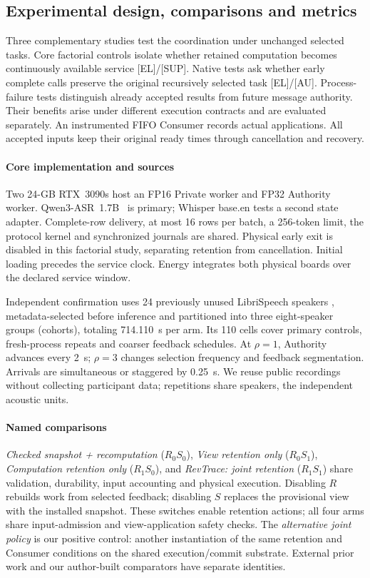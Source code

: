 \subsection{Experimental design, comparisons and metrics}
Three complementary studies test the coordination under unchanged
selected tasks. Core factorial controls isolate whether retained
computation becomes continuously available service [EL]/[SUP]. Native
tests ask whether early complete calls preserve the original recursively
selected task [EL]/[AU]. Process-failure tests distinguish already
accepted results from future message authority. Their benefits arise
under different execution contracts and are evaluated separately.
An instrumented FIFO Consumer records actual applications. All accepted
inputs keep their original ready times through cancellation and recovery.

\paragraph{Core implementation and sources}
Two 24-GB RTX~3090s host an FP16 Private worker and FP32 Authority worker.
Qwen3-ASR~1.7B~\cite{shi2026qwen3asr} is primary; Whisper base.en
\cite{radford2023whisper} tests a second state adapter. Complete-row
delivery, at most 16 rows per batch, a 256-token limit, the protocol kernel
and synchronized journals are shared. Physical early exit is disabled
in this factorial study, separating retention from cancellation.
Initial loading precedes the service clock. Energy integrates both
physical boards over the declared service window.

Independent confirmation uses 24 previously unused LibriSpeech speakers
\cite{panayotov2015librispeech}, metadata-selected before inference and
partitioned into three eight-speaker groups (cohorts), totaling 714.110~s per arm.
Its 110 cells cover primary controls, fresh-process repeats and coarser
feedback schedules. At $\rho=1$, Authority advances every 2~s;
$\rho=3$ changes selection frequency and feedback segmentation. Arrivals
are simultaneous or staggered by 0.25~s. We reuse public recordings without
collecting participant data; repetitions share speakers, the independent
acoustic units.

\paragraph{Named comparisons}
\emph{Checked snapshot + recomputation} ($R_0S_0$), \emph{View retention
only} ($R_0S_1$), \emph{Computation retention only} ($R_1S_0$), and
\emph{RevTrace: joint retention} ($R_1S_1$) share validation, durability,
input accounting and physical execution. Disabling $R$ rebuilds work
from selected feedback; disabling $S$ replaces the provisional view
with the installed snapshot. These switches enable retention actions;
all four arms share input-admission and view-application safety checks.
The \emph{alternative joint policy} is our positive control: another
instantiation of the same retention and Consumer conditions on the shared
execution/commit substrate. External prior work
and our author-built comparators have separate identities.

